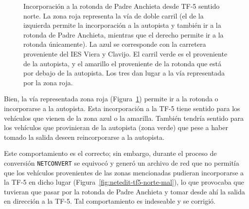 \begin{figure}[ht]
\begin{subfigure}[t]{0.48\textwidth}
      \label{fig:salida-tf5-norte-cerca}
    \end{subfigure}%
    \caption[Incorporación a la rotonda de Padre Anchieta desde TF-5 sentido norte.]{Incorporación a la rotonda de Padre Anchieta desde TF-5 sentido norte. La zona roja representa la vía de doble carril (el de la izquierda permite la incorporación a la autopista y también ir a la rotonda de Padre Anchieta, mientras que el derecho permite ir a la rotonda únicamente). La azul se corresponde con la carretera proveniente del IES Viera y Clavijo. El carril verde es el proveniente de la autopista, y el amarillo el proveniente de la rotonda que está por debajo de la autopista. Los tres dan lugar a la vía representada por la zona roja.}
    \label{fig:salida-tf5-norte}
\end{figure}

Bien, la vía representada zona roja (Figura~\ref{fig:salida-tf5-norte-cerca}) permite ir a la rotonda o incorporarse a la autopista. Esta incorporación a la TF-5 tiene sentido para los vehículos que vienen de la zona azul o la amarilla. También tendría sentido para los vehículos que provinieran de la autopista (zona verde) que pese a haber tomado la salida deseen reincorporarse a la autopista.

Este comportamiento es el correcto; sin embargo, durante el proceso de conversión \texttt{NETCONVERT} se equivocó y generó un archivo de red que no permitía que los vehículos provenientes de las zonas mencionadas pudieran incorporarse a la TF-5 en dicho lugar (Figura~\ref{fig:netedit-tf5-norte-mal}), lo que provocaba que tuvieran que pasar por la rotonda de Padre Anchieta y tomar desde ahí la salida en dirección a la TF-5. Tal comportamiento es indeseable y se corrigió.

